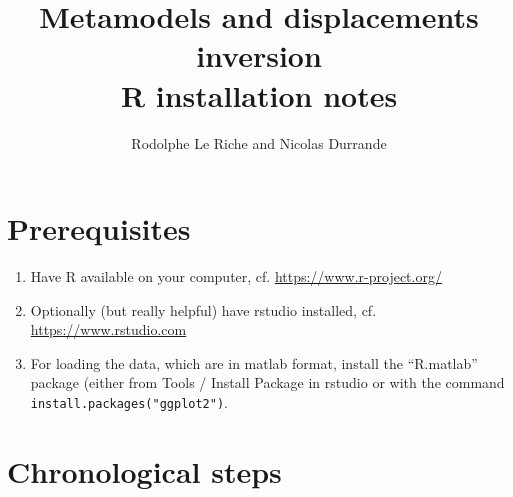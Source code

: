 \documentclass[12pt]{article}
\begin{document}
\title{Metamodels and displacements  inversion \\ R installation notes}
\author{Rodolphe Le Riche and Nicolas Durrande}
\maketitle

\section{Prerequisites}
\begin{enumerate}
\item Have R available on your computer, cf. \url{https://www.r-project.org/}
\item Optionally (but really helpful) have rstudio installed, cf. \url{https://www.rstudio.com}
\item For loading the data, which are in matlab format, install the ``R.matlab'' package (either from 
Tools / Install Package in rstudio or with the command \texttt{install.packages("ggplot2")}.
\end{enumerate}

\section{Chronological steps}
\end{document}
